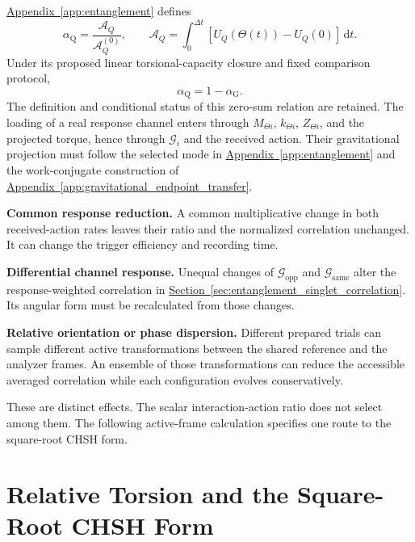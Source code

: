 \hyperref[app:entanglement]{Appendix~\ref*{app:entanglement}} defines
\begin{equation}
    \boxed{
    \alpha_{\mathrm Q}
    =\frac{\mathcal A_Q}{\mathcal A_Q^{(0)}},
    \qquad
    \mathcal A_Q
    =\int_0^{\Delta t}[U_Q(\Theta(t))-U_Q(0)]\,\mathrm dt
    }.
\end{equation}
Under its proposed linear torsional-capacity closure and fixed comparison protocol,
\begin{equation}
    \alpha_{\mathrm Q}=1-\alpha_{\mathrm G}.
\end{equation}
The definition and conditional status of this zero-sum relation are retained. The loading of a real response channel enters through $M_{\Theta i}$, $k_{\Theta i}$, $Z_{\Theta i}$, and the projected torque, hence through $\mathcal G_i$ and the received action. Their gravitational projection must follow the selected mode in \hyperref[app:entanglement]{Appendix~\ref*{app:entanglement}} and the work-conjugate construction of \hyperref[app:gravitational_endpoint_transfer]{Appendix~\ref*{app:gravitational_endpoint_transfer}}.

\noindent\textbf{Common response reduction.}
A common multiplicative change in both received-action rates leaves their ratio and the normalized correlation unchanged. It can change the trigger efficiency and recording time.

\medskip
\noindent\textbf{Differential channel response.}
Unequal changes of $\mathcal G_{\mathrm{opp}}$ and $\mathcal G_{\mathrm{same}}$ alter the response-weighted correlation in \hyperref[sec:entanglement_singlet_correlation]{Section~\ref*{sec:entanglement_singlet_correlation}}. Its angular form must be recalculated from those changes.

\medskip
\noindent\textbf{Relative orientation or phase dispersion.}
Different prepared trials can sample different active transformations between the shared reference and the analyzer frames. An ensemble of those transformations can reduce the accessible averaged correlation while each configuration evolves conservatively.

\medskip
These are distinct effects. The scalar interaction-action ratio does not select among them. The following active-frame calculation specifies one route to the square-root CHSH form.

\section{Relative Torsion and the Square-Root CHSH Form}

